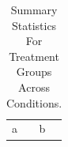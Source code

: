 \documentclass[article]{jss}
\begin{document}
\begin{table}
\caption{Summary Statistics For Treatment Groups Across Conditions.}
\begin{tabular}{ll}a & b\\\end{tabular}
\end{table}
\end{document}

